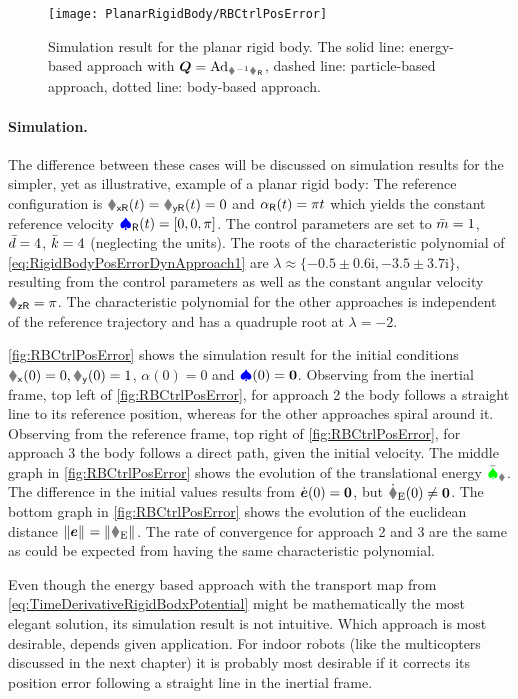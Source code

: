 \begin{figure}
 \centering
 \texttt{[image: PlanarRigidBody/RBCtrlPosError]}
 \caption{Simulation result for the planar rigid body. The solid line: energy-based approach with $\sysTransportMap = \Ad{\bodyHomoCoord{}{}^{-1}\bodyHomoCoordR{}{}}$, dashed line: particle-based approach, dotted line: body-based approach.}
 \label{fig:RBCtrlPosError}
\end{figure}

\paragraph{Simulation.}
The difference between these cases will be discussed on simulation results for the simpler, yet as illustrative, example of a planar rigid body:
The reference configuration is $\rxR(t) = \ryR(t) = 0$ and $\alpha_{\mathsf{R}}(t) = \pi t$ which yields the constant reference velocity $\boldsymbol{\textcolor{blue}{\spadesuit}}_{\mathsf{R}}(t) = [0,0,\pi]$.
The control parameters are set to $\bar{m}=1$, $\bar{d}=4$, $\bar{k}=4$ (neglecting the units).
The roots of the characteristic polynomial of \eqref{eq:RigidBodyPosErrorDynApproach1} are $\lambda \approx \{-0.5 \pm 0.6\mathrm{i}, -3.5 \pm 3.7\mathrm{i} \}$, resulting from the control parameters as well as the constant angular velocity $\wzR=\pi$.
The characteristic polynomial for the other approaches is independent of the reference trajectory and has a quadruple root at $\lambda = -2$.

\autoref{fig:RBCtrlPosError} shows the simulation result for the initial conditions $\rx(0) = 0, \ry(0) = 1$, $\alpha(0) = 0$ and $\boldsymbol{\textcolor{blue}{\spadesuit}}(0) = \boldsymbol{0}$.
Observing from the inertial frame, top left of \autoref{fig:RBCtrlPosError}, for approach 2 the body follows a straight line to its reference position, whereas for the other approaches spiral around it.
Observing from the reference frame, top right of \autoref{fig:RBCtrlPosError}, for approach 3 the body follows a direct path, given the initial velocity.
The middle graph in \autoref{fig:RBCtrlPosError} shows the evolution of the translational energy $\totalEnergyC_{\r}$.
The difference in the initial values results from $\dot{\boldsymbol{e}}(0) = \boldsymbol{0}$, but $\rEd(0) \neq \tuple{0}$.
The bottom graph in \autoref{fig:RBCtrlPosError} shows the evolution of the euclidean distance $\norm{\tuple{e}} = \norm{\rE}$.
The rate of convergence for approach 2 and 3 are the same as could be expected from having the same characteristic polynomial.

Even though the energy based approach with the transport map from \eqref{eq:TimeDerivativeRigidBodxPotential} might be mathematically the most elegant solution, its simulation result is not intuitive.
Which approach is most desirable, depends given application.
For indoor robots (like the multicopters discussed in the next chapter) it is probably most desirable if it corrects its position error following a straight line in the inertial frame.


